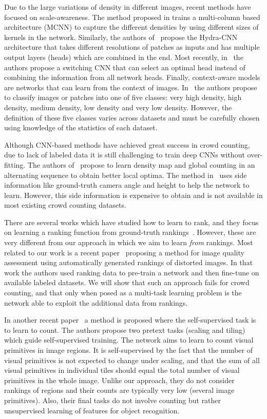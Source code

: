 \documentclass[10pt,twocolumn,letterpaper]{article}
\begin{document}
Due to the large variations of density in different images, recent
methods have focused on scale-awareness. The method proposed in
\cite{zhang2016single} trains a multi-column based architecture (MCNN)
to capture the different densities by using different sizes of kernels
in the network. Similarly, the authors of~\cite{onoro2016towards}
propose the Hydra-CNN architecture that takes different resolutions of
patches as inputs and has multiple output layers (heads) which are
combined in the end. Most recently, in~\cite{Sam_2017_CVPR} the
authors propose a switching CNN that can select an optimal head
instead of combining the information from all network heads. Finally,
context-aware models are networks that can learn from the context of
images. In~\cite{fu2015fast,sindagi2017generating} the authors propose
to classify images or patches into one of five classes: very high
density, high density, medium density, low density and very low
density. However, the definition of these five classes varies across
datasets and must be carefully chosen using knowledge of the
statistics of each dataset.

Although CNN-based methods have achieved great success in crowd
counting, due to lack of labeled data it is still challenging to train
deep CNNs without over-fitting. The authors of~\cite{zhang2015cross}
propose to learn density map and global counting in an alternating
sequence to obtain better local optima. The method
in~\cite{kang2016crowd} uses side information like ground-truth camera
angle and height to help the network to learn. However, this side
information is expensive to obtain and is not available in most
existing crowd counting datasets.

There are several works which have studied how to learn to rank, and
they focus on learning a ranking function from ground-truth
rankings~\cite{chen2009ranking,test1}. However, these are very
different from our approach in which we aim to learn \emph{from}
rankings. Most related to our work is a recent
paper~\cite{liu2017rankiqa} proposing a method for image quality
assessment using automatically generated rankings of distorted
images. In that work the authors used ranking data to pre-train a
network and then fine-tune on available labeled datasets.  We will
show that such an approach fails for crowd counting, and that only when
posed as a multi-task learning problem is the network able to exploit
the additional data from rankings.

In another recent paper~\cite{noroozi2017representation} a method is
proposed where the self-supervised task is to learn to count. The
authors propose two pretext tasks (scaling and tiling) which guide
self-supervised training. The network aims to learn to count visual
primitives in image regions. It is self-supervised by the fact that
the number of visual primitives is not expected to change under
scaling, and that the sum of all visual primitives in individual tiles
should equal the total number of visual primitives in the whole
image. Unlike our approach, they do not consider rankings of regions
and their counts are typically very low (several image
primitives). Also, their final tasks do not involve counting but
rather unsupervised learning of features for object recognition.
\end{document}
